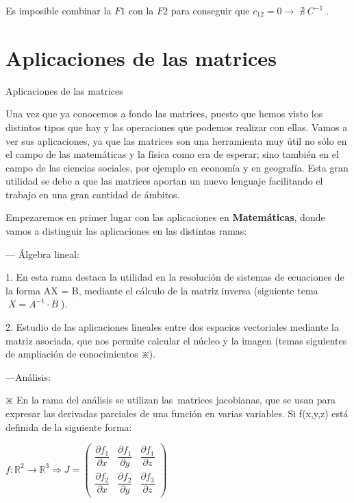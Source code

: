 \begin{ejem}
\noindent \small{Es imposible combinar la $F1$ con la $F2$ para conseguir que $c_{12}=0 \to \; \nexists \;  C^{-1} \; $}\normalsize{.} 
\end{ejem}


\newpage %
\section{Aplicaciones de las matrices}


\begin{myexampleblock}{Aplicaciones de las matrices}
	
Una vez que ya conocemos a fondo las matrices, puesto que hemos visto los distintos tipos que hay y las operaciones que podemos realizar con ellas. Vamos a ver sus aplicaciones, ya que las matrices son una herramienta muy útil no sólo en el campo de las matemáticas y la física como era de esperar; sino también en el campo de las ciencias sociales, por ejemplo en economía y en geografía. Esta gran utilidad se debe a que las matrices aportan un nuevo lenguaje facilitando el trabajo en una gran cantidad de ámbitos.

Empezaremos en primer lugar con las aplicaciones en \textbf{Matemáticas}, donde vamos a distinguir las aplicaciones en las distintas ramas:

--- Álgebra lineal: 

1. En esta rama destaca la utilidad en la resolución de sistemas de ecuaciones de la forma AX = B, mediante el cálculo de la matriz inversa (siguiente tema $\; X=A^{-1}\cdot B\; $).

2. Estudio de las aplicaciones lineales entre dos espacios vectoriales mediante la matriz asociada, que nos permite calcular el núcleo y la imagen (temas siguientes de ampliación de conocimientos $\divideontimes$).

---Análisis:

$\divideontimes$ En la rama del análisis se utilizan las matrices jacobianas, que se usan para expresar las derivadas parciales de una función en varias variables. Si f(x,y,z) está definida de la siguiente forma: 

$f:\mathbb R^2 \to \mathbb R^3 \Rightarrow J=\left(\begin{matrix} \dfrac{\partial f_1}{\partial x}  &\dfrac{\partial f_1}{\partial y}&\dfrac{\partial f_1}{\partial z} \\ \dfrac{\partial f_2}{\partial x} &\dfrac{\partial f_2}{\partial y} &\dfrac{\partial f_3}{\partial z}  \end{matrix}\right)$


\end{myexampleblock}
